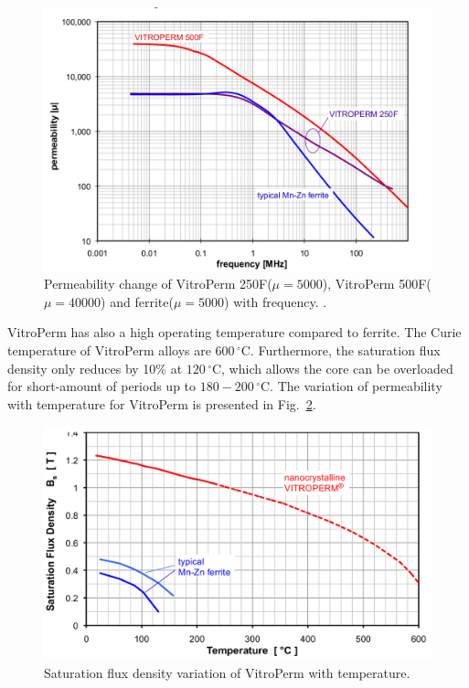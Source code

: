 \documentclass[a4paper, 11pt]{article} %
\begin{document}
\begin{figure}[]
  \centering
    \includegraphics[scale=0.3]{vitroperm500_250_permeability}
  \caption{Permeability change of VitroPerm 250F($\mu = 5000$), VitroPerm 500F($\mu = 40000$) and ferrite($\mu = 5000$) with frequency. \cite{vitroterm_manual}.}
  \label{vitroperm500_250_permeability}
\end{figure}


VitroPerm has also a high operating temperature compared to ferrite. The Curie temperature of VitroPerm alloys are $600\,^{\circ}\mathrm{C}$. Furthermore, the saturation flux density only reduces by 10\% at $120\,^{\circ}\mathrm{C}$, which allows the core can be overloaded for short-amount of periods up to $180-200 \,^{\circ}\mathrm{C}$. The variation of permeability with temperature for VitroPerm is presented in Fig.~\ref{temp_vs_saturation}.

\begin{figure}[]
  \centering
    \includegraphics[scale=0.3]{temp_vs_saturation}
  \caption{Saturation flux density variation of VitroPerm with temperature.}
  \label{temp_vs_saturation}
\end{figure}
\end{document}
